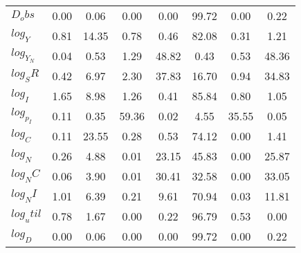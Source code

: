 \begin{center}
\begin{longtable}{lccccccc}
$D_obs     $	 & 	        0.00	 & 	        0.06	 & 	        0.00	 & 	        0.00	 & 	       99.72	 & 	        0.00	 & 	        0.22 \\ 
$log_Y     $	 & 	        0.81	 & 	       14.35	 & 	        0.78	 & 	        0.46	 & 	       82.08	 & 	        0.31	 & 	        1.21 \\ 
$log_Y_N   $	 & 	        0.04	 & 	        0.53	 & 	        1.29	 & 	       48.82	 & 	        0.43	 & 	        0.53	 & 	       48.36 \\ 
$log_SR    $	 & 	        0.42	 & 	        6.97	 & 	        2.30	 & 	       37.83	 & 	       16.70	 & 	        0.94	 & 	       34.83 \\ 
$log_I     $	 & 	        1.65	 & 	        8.98	 & 	        1.26	 & 	        0.41	 & 	       85.84	 & 	        0.80	 & 	        1.05 \\ 
$log_p_I   $	 & 	        0.11	 & 	        0.35	 & 	       59.36	 & 	        0.02	 & 	        4.55	 & 	       35.55	 & 	        0.05 \\ 
$log_C     $	 & 	        0.11	 & 	       23.55	 & 	        0.28	 & 	        0.53	 & 	       74.12	 & 	        0.00	 & 	        1.41 \\ 
$log_N     $	 & 	        0.26	 & 	        4.88	 & 	        0.01	 & 	       23.15	 & 	       45.83	 & 	        0.00	 & 	       25.87 \\ 
$log_NC    $	 & 	        0.06	 & 	        3.90	 & 	        0.01	 & 	       30.41	 & 	       32.58	 & 	        0.00	 & 	       33.05 \\ 
$log_NI    $	 & 	        1.01	 & 	        6.39	 & 	        0.21	 & 	        9.61	 & 	       70.94	 & 	        0.03	 & 	       11.81 \\ 
$log_util  $	 & 	        0.78	 & 	        1.67	 & 	        0.00	 & 	        0.22	 & 	       96.79	 & 	        0.53	 & 	        0.00 \\ 
$log_D     $	 & 	        0.00	 & 	        0.06	 & 	        0.00	 & 	        0.00	 & 	       99.72	 & 	        0.00	 & 	        0.22 \\ 
\end{longtable}
 \end{center}
